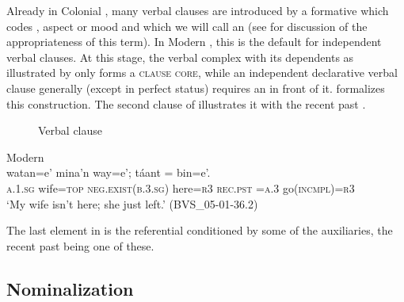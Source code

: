 \documentclass[output=paper]{langsci/langscibook}
\begin{document}
Already in Colonial , many verbal clauses are introduced by a formative which codes , aspect or mood and which we will call an  (see  for discussion of the appropriateness of this term). In Modern , this is the default for independent verbal clauses. At this stage, the verbal complex with its dependents as illustrated by  only forms a \textsc{clause core}, while an independent declarative verbal clause generally (except in perfect status) requires an  in front of it.  formalizes this construction. The second clause of  illustrates it with the recent past .



\begin{figure}
\caption{Verbal clause}\label{fig:lehmann:6}

\end{figure}


\ea\label{ex:lehmann:5}
Modern  \\
\gll     {}        watan=e'               mina'n                       way=e';         táant                   =    bin=e'.\\
	\textsc{a.1.sg}   wife=\textsc{top}    \textsc{neg.exist(b.3.sg)}    here=\textsc{r3} \textsc{rec.pst}  \textsc{=a.3}    go\textsc{(incmpl)=r3}\\
\glt ‘My wife isn't here; she just left.’ (BVS\_05-01-36.2)
\z



The last element in  is the referential  conditioned by some of the auxiliaries, the recent past  being one of these.


\subsection{Nominalization}\label{sec:lehmann:4.3}
\end{document}
